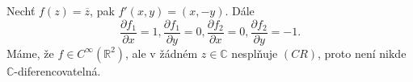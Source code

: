 \begin{example}
Nechť $f(z) = \overline{z}$, pak $f'(x,y) = (x,-y)$. Dále 
$$\frac{\partial f_1}{\partial x} = 1, \frac{\partial f_1}{\partial y} = 0, \frac{\partial f_2}{\partial x} = 0, \frac{\partial f_2}{\partial y} = -1.$$
Máme, že $f\in C^\infty(\mathbb{R}^2)$, ale v žádném $z\in \mathbb{C}$ nesplňuje $(CR)$, proto není nikde $\mathbb{C}$-diferencovatelná.
\end{example}

